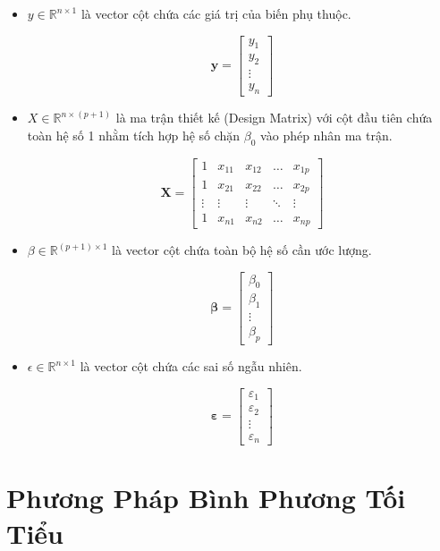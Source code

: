 \begin{itemize}[topsep=0pt, itemsep=2.5pt, leftmargin=1.5cm]
    \item $y \in \mathbb{R}^{n \times 1}$ là vector cột chứa các giá trị của biến phụ thuộc.

    $$\mathbf{y} = \begin{bmatrix} y_1 \\ y_2 \\ \vdots \\ y_n \end{bmatrix}$$

    \item $X \in \mathbb{R}^{n \times (p + 1)}$ là ma trận thiết kế (Design Matrix) với cột đầu tiên chứa toàn hệ số 1 nhằm tích hợp hệ số chặn $\beta_0$ vào phép nhân ma trận.

    $$\mathbf{X} = \begin{bmatrix} 1 & x_{11} & x_{12} & \dots & x_{1p} \\ 1 & x_{21} & x_{22} & \dots & x_{2p} \\ \vdots & \vdots & \vdots & \ddots & \vdots \\ 1 & x_{n1} & x_{n2} & \dots & x_{np} \end{bmatrix}$$

    \item $\beta \in \mathbb{R}^{(p + 1) \times 1}$ là vector cột chứa toàn bộ hệ số cần ước lượng.

    $$\boldsymbol{\beta} = \begin{bmatrix} \beta_0 \\ \beta_1 \\ \vdots \\ \beta_p \end{bmatrix}$$

    \item $\epsilon \in \mathbb{R}^{n \times 1}$ là vector cột chứa các sai số ngẫu nhiên.

    $$\boldsymbol{\varepsilon} = \begin{bmatrix} \varepsilon_1 \\ \varepsilon_2 \\ \vdots \\ \varepsilon_n \end{bmatrix}$$
\end{itemize}

\section{Phương Pháp Bình Phương Tối Tiểu}

